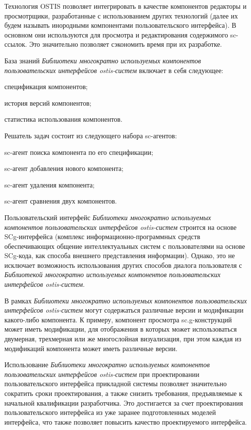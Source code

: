 Технология OSTIS позволяет интегрировать в качестве компонентов редакторы и просмотрщики, разработанные с использованием других технологий (далее их будем называть инородными компонентами пользовательского интерфейса). В основном они используются для просмотра и редактирования содержимого sc-ссылок. Это значительно позволяет сэкономить время при их разработке.

База знаний \textit{Библиотеки многократно используемых компонентов пользовательских интерфейсов ostis-систем} включает в себя следующее:
\begin{textitemize}
	\item спецификация компонентов;
	\item история версий компонентов;
	\item статистика использования компонентов.
\end{textitemize}

Решатель задач состоит из следующего набора sc-агентов:
\begin{textitemize}
	\item sc-агент поиска компонента по его спецификации;
	\item sc-агент добавления нового компонента;
	\item sc-агент удаления компонента;
	\item sc-агент сравнения двух компонентов.
\end{textitemize}

Пользовательский интерфейс \textit{Библиотеки многократно используемых компонентов пользовательских интерфейсов ostis-систем} строится на основе SCg-интерфейса
(комплекс информационно-программных средств обеспечивающих общение интеллектуальных
систем с пользователями на основе SCg-кода, как способа внешнего представления
информации). Однако, это не исключает возможность использования других способов диалога пользователя с \textit{Библиотекой многократно используемых компонентов пользовательских интерфейсов ostis-систем}.

В рамках \textit{Библиотеки многократно используемых компонентов пользовательских интерфейсов ostis-систем} могут содержаться различные версии и модификации
какого-либо компонента. К примеру, компонент просмотра sc.g-конструкций может иметь
модификации, для отображения в которых может использоваться двумерная, трехмерная или
же многослойная визуализация, при этом каждая из модификаций компонента может иметь
различные версии.

Использование \textit{Библиотеки многократно используемых компонентов пользовательских интерфейсов ostis-систем} при проектировании пользовательского интерфейса прикладной системы позволяет значительно сократить сроки проектирования, а также снизить требования, предъявляемые к начальной квалификации разработчика. Это достигается за счет проектирования пользовательского интерфейса из уже заранее подготовленных моделей интерфейса, что также позволяет повысить качество проектируемого интерфейса.

